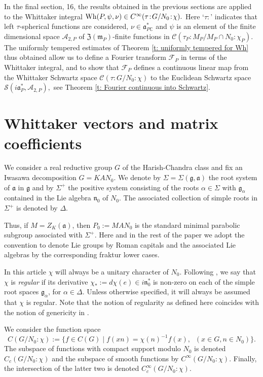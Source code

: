 \documentclass[12pt,a4paper]{article}
\def\msy#1{{\mathbb #1}}
\def\C{{\msy C}}
\def\ga{\alpha}
\def\gD{\Delta}
\def\gS{\Sigma}
\def\got#1{\mathfrak #1}
\def\fa{{\got a}}
\def\fg{{\got g}}
\def\fm{{\got m}}
\def\fn{{\got n}}
\def\iC{{\scriptscriptstyle \C}}
\def\cA{{\mathcal A}}
\def\cC{{\mathcal C}}
\def\cF{{\mathcal F}}
\def\cS{{\mathcal S}}
\numberwithin{Thm}{section}
\numberwithin{equation}{section}
\def\bN{N}
\def\fZ{{\mathfrak Z}}
\def\Wh{{\rm Wh}}
\def\faPdc{{\fa_{P\iC}^*}}
\def\faPd{{\fa_P^*}}
\numberwithin{equation}{section}
\def\fZ{{\mathfrak Z}}
\def\faPdc{\fa_{P\iC}^*}
\def\col{\!:\!}
\def\cchi{\chi}
\begin{document}
In the final section, 16, the results obtained in the previous sections are applied 
to the Whittaker integral $\Wh(P, \psi, \nu) \in C^\infty(\tau\!:\! G/N_0\col \cchi).$ 
Here `$\tau\!:$' indicates that left $\tau$-spherical functions are considered, 
$\nu \in \faPdc$ and $\psi$ is an element of the finite dimensional space $\cA_{2,P}$ of 
$\fZ(\fm_P)$-finite functions in $\cC(\tau_P\col M_P/M_P\cap N_0\!: \!\cchi_P).$ 
The uniformly tempered estimates of Theorem \ref{t: uniformly tempered for Wh} thus 
obtained allow us to define 
a Fourier transform $\cF_P$ in terms of the Whittaker integral, and to show 
that $\cF_P$  defines a continuous linear map from the Whittaker Schwartz space
$\cC(\tau\!:\! G/N_0\col \cchi)$ to the Euclidean Schwartz space $\cS(i\faPd , \cA_{2,P}),$  see 
Theorem \ref{t: Fourier continuous into Schwartz}. 

\section{Whittaker vectors and matrix coefficients}
\label{s: whittaker vectors}
We consider a real reductive group $G$ of the Harish-Chandra class
and fix an Iwasawa decomposition $G = KAN_0.$ 
We denote by $\gS= \gS(\fg, \fa)$ 
the root system of $\fa$ in $\fg$ and by $\gS^+$ the positive system 
consisting of the roots $\ga \in \gS$ with $\fg_\ga$ contained in the 
Lie algebra $\fn_0$ of $N_0.$ The associated
collection of simple roots in  $\gS^+$ is denoted by $\gD.$ 

Thus,
if $M= Z_K(\fa)$, then $P_0:= MA N_0$ is the standard minimal parabolic
subgroup associated with $\gS^+.$ 
%
Here and in the rest of the paper we adopt the convention to 
denote Lie groups by Roman capitals and the associated Lie algebras by the corresponding
fraktur lower cases.
%

In this article $\cchi$ will always be a  unitary character of $\bN_0$. 
Following \cite[p.~142]{HCwhit}, we say that $\cchi$ is 
{\em regular} if its derivative $\cchi_*:= d\cchi(e) \in i \fn_0^*$ is non-zero on
each of the simple root spaces $\fg_\ga$, for $\ga \in \gD.$ 
Unless otherwise specified, it will always be assumed that $\chi$ is regular.
Note that the notion of regularity as defined here coincides with the notion 
of genericity in \cite[p.~371]{Wrrg2}.

We consider the function space 
\begin{equation}
\label{e: continuous whittaker space} 
C(G/\bN_0\col \cchi) :=\{ f \in C(G) \mid f(xn) = \cchi(n)^{-1} f(x), \;\;(x \in G, n \in \bN_0)\}.
\end{equation}
The subspace of functions with compact support modulo $\bN_0$ 
is denoted $C_c(G/\bN_0\col \cchi)$ and the subspace of smooth functions by $C^\infty(G/\bN_0\col \cchi).$ Finally, the intersection of the latter two is denoted $C^\infty_c(G/\bN_0\col \cchi).$ 
\end{document}
